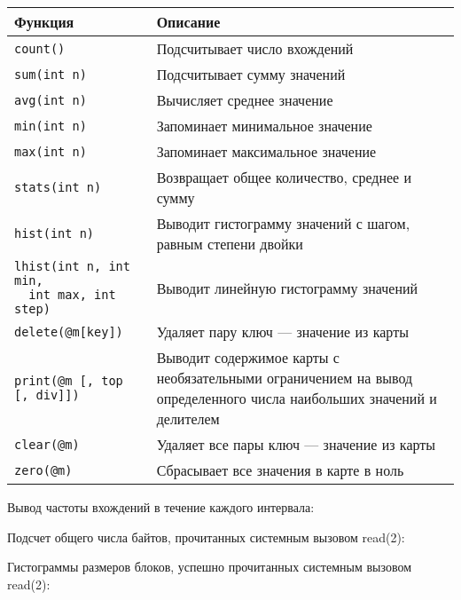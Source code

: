 \begin{tabular}{|l|p{9cm}|}
\hline
\rowcolor{gray!40}
Функция & Описание \\
\hline
\texttt{count()} & Подсчитывает число вхождений \\
\hline
\texttt{sum(int n)} & Подсчитывает сумму значений \\
\hline
\texttt{avg(int n)} & Вычисляет среднее значение \\
\hline
\texttt{min(int n)} & Запоминает минимальное значение \\
\hline
\texttt{max(int n)} & Запоминает максимальное значение \\
\hline
\texttt{stats(int n)} & Возвращает общее количество, среднее и сумму \\
\hline
\texttt{hist(int n)} & Выводит гистограмму значений с шагом, равным степени двойки \\
\hline
\makecell[l]{\texttt{lhist(int n, int min,} \\ \texttt{\ \ int max, int step)} }  & Выводит линейную гистограмму значений  \\
\hline
\texttt{delete(@m[key])} & Удаляет пару ключ — значение из карты  \\
\hline
\texttt{print(@m [, top [, div]])} & Выводит содержимое карты с необязательными ограничением на вывод определенного числа наибольших значений и  делителем   \\
\hline
\texttt{clear(@m)} & Удаляет все пары ключ — значение из карты  \\
\hline
\texttt{zero(@m)} & Сбрасывает все значения в карте в ноль  \\
\hline
\end{tabular}


\noindent Вывод частоты вхождений в течение каждого интервала: \\

\noindent Подсчет общего числа байтов, прочитанных системным вызовом read(2): \\

\noindent Гистограммы размеров блоков, успешно прочитанных системным вызовом read(2): \\


